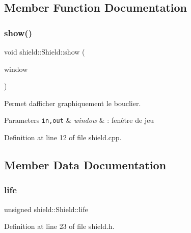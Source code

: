 \subsection{Member Function Documentation}
\mbox{\label{structshield_1_1_shield_a768986dee4a088af222f1b987a91d62d}} 
\subsubsection{\texorpdfstring{show()}{show()}}
{\footnotesize\ttfamily void shield\+::\+Shield\+::show (\begin{DoxyParamCaption}\item[{\hyperlink{class_min_g_l}{Min\+GL} \&}]{window }\end{DoxyParamCaption})}



Permet d\textquotesingle{}afficher graphiquement le bouclier. 


\begin{DoxyParams}[1]{Parameters}
\mbox{\tt in,out}  & {\em window} & \+: fenêtre de jeu \\
\hline
\end{DoxyParams}


Definition at line 12 of file shield.\+cpp.



\subsection{Member Data Documentation}
\mbox{\label{structshield_1_1_shield_aec13726342753b52ec6954b5ced3497d}} 
\subsubsection{\texorpdfstring{life}{life}}
{\footnotesize\ttfamily unsigned shield\+::\+Shield\+::life}



Definition at line 23 of file shield.\+h.

\mbox{\label{structshield_1_1_shield_aee8c1d30a8e23c2097048a04efe9d01b}} 
